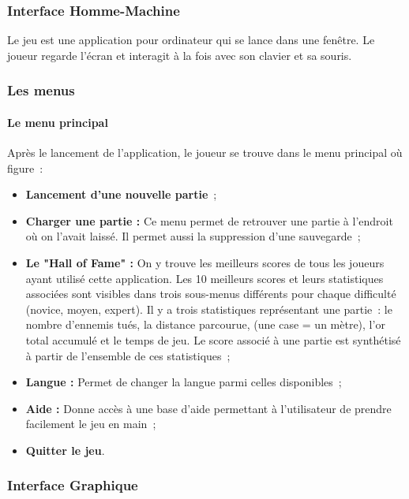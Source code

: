 \documentclass[11pt]{article}
\begin{document}
\subsubsection{Interface Homme-Machine}

Le jeu est une application pour ordinateur qui se lance dans une fenêtre. Le joueur regarde l'écran et interagit à la fois avec son clavier et sa souris.


\subsubsection{Les menus}


\paragraph{Le menu principal}

Après le lancement de l'application, le joueur se trouve dans le menu principal où figure~:

\begin{itemize}
   \item \textbf{Lancement d'une nouvelle partie}~;
   \item \textbf{Charger une partie : }Ce menu permet de retrouver une partie à l'endroit où on l'avait laissé. Il permet aussi la suppression d'une sauvegarde~;
   \item \textbf{Le "Hall of Fame" : }On y trouve les meilleurs scores de tous les joueurs ayant utilisé cette application. Les 10 meilleurs scores et leurs statistiques associées sont visibles dans trois sous-menus différents pour chaque difficulté (novice, moyen, expert). Il y a trois statistiques représentant une partie~: le nombre d'ennemis tués, la distance parcourue, (une case = un mètre), l'or total accumulé et le temps de jeu. Le score associé à une partie est synthétisé à partir de l'ensemble de ces statistiques~;
   \item \textbf{Langue : }Permet de changer la langue parmi celles disponibles~;
   \item \textbf{Aide : }Donne accès à une base d'aide permettant à l’utilisateur de prendre facilement le jeu en main~;
   \item \textbf{Quitter le jeu}.
\end{itemize}


\newpage %

\subsubsection{Interface Graphique}
\end{document}
